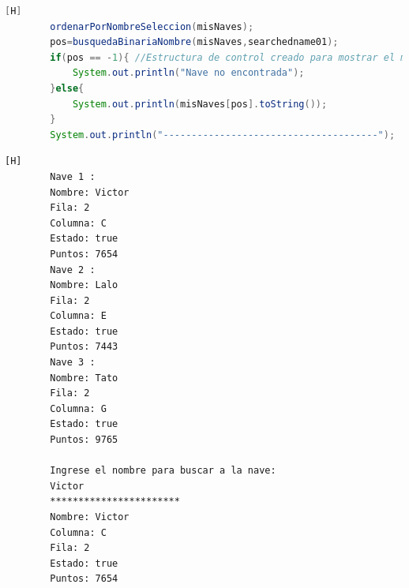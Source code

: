 \documentclass{article}
\begin{document}
	\begin{lstlisting}[language=java,caption={Las lineas de codigo de lo creado:}][H]
        ordenarPorNombreSeleccion(misNaves);
        pos=busquedaBinariaNombre(misNaves,searchedname01);
        if(pos == -1){ //Estructura de control creado para mostrar el mensaje de "Nave no encontrada" debido a que esta buscando y comparando con los demas nombres de las otras naves
            System.out.println("Nave no encontrada");
        }else{
            System.out.println(misNaves[pos].toString());
        }
        System.out.println("--------------------------------------");
	\end{lstlisting}
    \begin{lstlisting}[language=bash,caption={La ejecucion del codigo completo:}][H]
		Nave 1 : 
		Nombre: Victor
		Fila: 2
		Columna: C
		Estado: true
		Puntos: 7654
		Nave 2 : 
		Nombre: Lalo
		Fila: 2
		Columna: E
		Estado: true
		Puntos: 7443
		Nave 3 : 
		Nombre: Tato
		Fila: 2
		Columna: G
		Estado: true
		Puntos: 9765
		
		Ingrese el nombre para buscar a la nave: 
		Victor
		***********************
		Nombre: Victor
		Columna: C
		Fila: 2
		Estado: true
		Puntos: 7654

    \end{lstlisting}
\end{document}
